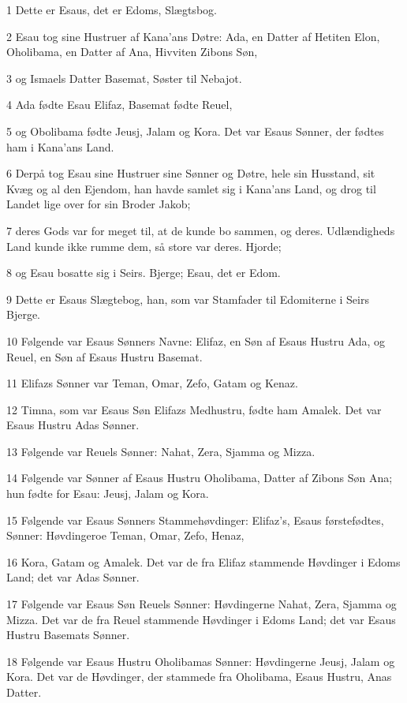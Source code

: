 \par 1 Dette er Esaus, det er Edoms, Slægtsbog.
\par 2 Esau tog sine Hustruer af Kana'ans Døtre: Ada, en Datter af Hetiten Elon, Oholibama, en Datter af Ana, Hivviten Zibons Søn,
\par 3 og Ismaels Datter Basemat, Søster til Nebajot.
\par 4 Ada fødte Esau Elifaz, Basemat fødte Reuel,
\par 5 og Obolibama fødte Jeusj, Jalam og Kora. Det var Esaus Sønner, der fødtes ham i Kana'ans Land.
\par 6 Derpå tog Esau sine Hustruer sine Sønner og Døtre, hele sin Husstand, sit Kvæg og al den Ejendom, han havde samlet sig i Kana'ans Land, og drog til Landet lige over for sin Broder Jakob;
\par 7 deres Gods var for meget til, at de kunde bo sammen, og deres. Udlændigheds Land kunde ikke rumme dem, så store var deres. Hjorde;
\par 8 og Esau bosatte sig i Seirs. Bjerge; Esau, det er Edom.
\par 9 Dette er Esaus Slægtebog, han, som var Stamfader til Edomiterne i Seirs Bjerge.
\par 10 Følgende var Esaus Sønners Navne: Elifaz, en Søn af Esaus Hustru Ada, og Reuel, en Søn af Esaus Hustru Basemat.
\par 11 Elifazs Sønner var Teman, Omar, Zefo, Gatam og Kenaz.
\par 12 Timna, som var Esaus Søn Elifazs Medhustru, fødte ham Amalek. Det var Esaus Hustru Adas Sønner.
\par 13 Følgende var Reuels Sønner: Nahat, Zera, Sjamma og Mizza.
\par 14 Følgende var Sønner af Esaus Hustru Oholibama, Datter af Zibons Søn Ana; hun fødte for Esau: Jeusj, Jalam og Kora.
\par 15 Følgende var Esaus Sønners Stammehøvdinger: Elifaz's, Esaus førstefødtes, Sønner: Høvdingeroe Teman, Omar, Zefo, Henaz,
\par 16 Kora, Gatam og Amalek. Det var de fra Elifaz stammende Høvdinger i Edoms Land; det var Adas Sønner.
\par 17 Følgende var Esaus Søn Reuels Sønner: Høvdingerne Nahat, Zera, Sjamma og Mizza. Det var de fra Reuel stammende Høvdinger i Edoms Land; det var Esaus Hustru Basemats Sønner.
\par 18 Følgende var Esaus Hustru Oholibamas Sønner: Høvdingerne Jeusj, Jalam og Kora. Det var de Høvdinger, der stammede fra Oholibama, Esaus Hustru, Anas Datter.

